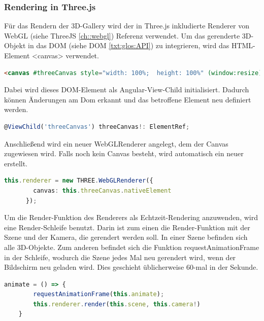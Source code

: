 \subsubsection{Rendering in Three.js}
Für das Rendern der 3D-Gallery wird der in Three.js inkludierte Renderer von WebGL (siehe ThreeJS \ref{ch::webgl}) Referenz verwendet. Um das gerenderte 3D-Objekt in das DOM (siehe DOM \ref{txt:glos:API}) zu integrieren, wird das HTML-Element <canvas> verwendet. \cite{ThreejsWebGLRenderer}

\begin{lstlisting}[caption={Canvas-Element in HTML},language=HTML,label=lst:impl:canvas]
    <canvas #threeCanvas style="width: 100%;  height: 100%" (window:resize)="onResize($event)"></canvas>
\end{lstlisting}
Dabei wird dieses DOM-Element als Angular-View-Child initialisiert. Dadurch können Änderungen am Dom erkannt und das betroffene Element neu definiert werden. \cite{AngularViewChild}
\begin{lstlisting}[caption={Canvas als View-Child initialisieren},language=TypeScript,label=lst:impl:viewchild]
    @ViewChild('threeCanvas') threeCanvas!: ElementRef;
\end{lstlisting}
Anschließend wird ein neuer WebGLRenderer angelegt, dem der Canvas zugewiesen wird. Falls noch kein Canvas besteht, wird automatisch ein neuer erstellt. \cite{ThreejsWebGLRenderer}
\begin{lstlisting}[caption={WebGlRenderer anlegen},language=TypeScript,label=lst:impl:WebGlRenderer]
    this.renderer = new THREE.WebGLRenderer({
        canvas: this.threeCanvas.nativeElement
      });
\end{lstlisting}
Um die Render-Funktion des Renderers als Echtzeit-Rendering anzuwenden, wird eine Render-Schleife benutzt. Darin ist zum einen die Render-Funktion mit der Szene und der Kamera, die gerendert werden soll. In einer Szene befinden sich alle 3D-Objekte. Zum anderen befindet sich die Funktion requestAnimationFrame in der Schleife, wodurch die Szene jedes Mal neu gerendert wird, wenn der Bildschirm neu geladen wird. Dies geschieht üblicherweise 60-mal in der Sekunde. \cite{ThreejsCreateAScene}
\begin{lstlisting}[caption={Animations-Schleife},language=TypeScript,label=lst:impl:animationloop]
    animate = () => {
        requestAnimationFrame(this.animate);
        this.renderer.render(this.scene, this.camera!)
    }  
\end{lstlisting}

